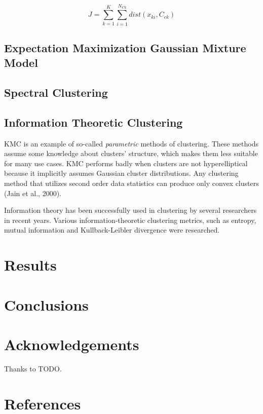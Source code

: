 \documentclass[conference]{IEEEtran}
\begin{document}
\begin{equation}\label{ECMJ}
J = \sum_{k=1}^K \sum_{i=1}^{N_{Ck}} dist(x_{ki}, C_{ck})
\end{equation}

\subsection{Expectation Maximization Gaussian Mixture Model}

\subsection{Spectral Clustering}

\subsection{Information Theoretic Clustering}%
KMC is an example of so-called \textit{parametric} methods of clustering. These
methods assume some knowledge about clusters' structure, which makes them less
suitable for many use cases. KMC performs badly when clusters are not hyperelliptical
because it implicitly assumes Gaussian cluster distributions. Any clustering method
that utilizes second order data statistics can produce only convex clusters (Jain et al., 2000).

Information theory has been successfully used in clustering by several researchers in recent years.
Various information-theoretic clustering metrics, such as entropy, mutual information and
Kullback-Leibler divergence were researched.

\section{Results}

\section{Conclusions}

\section*{Acknowledgements}
Thanks to TODO.

\section*{References}
\end{document}
